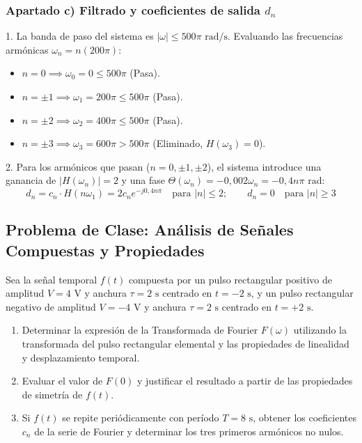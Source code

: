 \begin{resolucion}
\subsubsection*{Apartado c) Filtrado y coeficientes de salida $d_n$}

1. La banda de paso del sistema es $|\omega| \le 500\pi\text{ rad/s}$.
   Evaluando las frecuencias armónicas $\omega_n = n (200\pi)$:
   \begin{itemize}
       \item $n = 0 \implies \omega_0 = 0 \le 500\pi$ (Pasa).
       \item $n = \pm 1 \implies \omega_1 = 200\pi \le 500\pi$ (Pasa).
       \item $n = \pm 2 \implies \omega_2 = 400\pi \le 500\pi$ (Pasa).
       \item $n = \pm 3 \implies \omega_3 = 600\pi > 500\pi$ (Eliminado, $H(\omega_3) = 0$).
   \end{itemize}

2. Para los armónicos que pasan ($n = 0, \pm 1, \pm 2$), el sistema introduce una ganancia de $|H(\omega_n)| = 2$ y una fase $\Theta(\omega_n) = -0{,}002 \omega_n = -0{,}4 n \pi\text{ rad}$:
   \[
   d_n = c_n \cdot H(n\omega_1) = 2 c_n e^{-j 0{,}4 n \pi} \quad \text{para } |n| \le 2; \qquad d_n = 0 \quad \text{para } |n| \ge 3
   \]
\end{resolucion}

\newpage

\subsection{Problema de Clase: Análisis de Señales Compuestas y Propiedades}

\begin{problema}
Sea la señal temporal $f(t)$ compuesta por un pulso rectangular positivo de amplitud $V = 4\text{ V}$ y anchura $\tau = 2\text{ s}$ centrado en $t = -2\text{ s}$, y un pulso rectangular negativo de amplitud $V = -4\text{ V}$ y anchura $\tau = 2\text{ s}$ centrado en $t = +2\text{ s}$.

\begin{enumerate}[label=\alph*)]
    \item Determinar la expresión de la Transformada de Fourier $F(\omega)$ utilizando la transformada del pulso rectangular elemental y las propiedades de linealidad y desplazamiento temporal.
    \item Evaluar el valor de $F(0)$ y justificar el resultado a partir de las propiedades de simetría de $f(t)$.
    \item Si $f(t)$ se repite periódicamente con período $T = 8\text{ s}$, obtener los coeficientes $c_n$ de la serie de Fourier y determinar los tres primeros armónicos no nulos.
\end{enumerate}
\end{problema}

